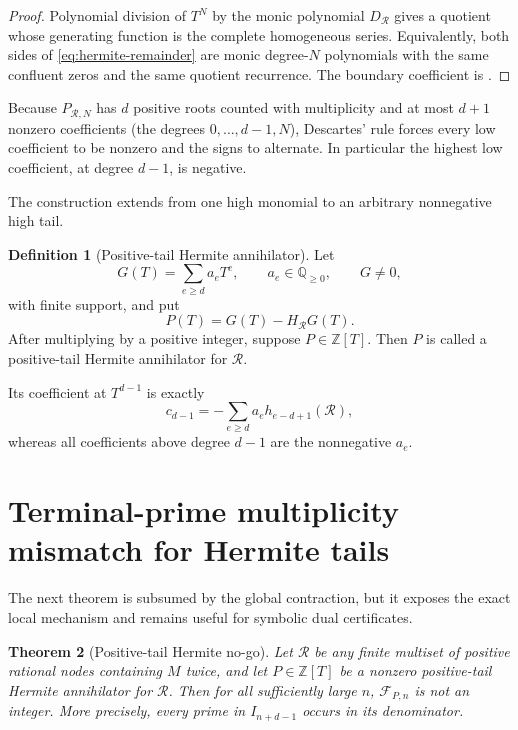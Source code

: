 \documentclass[11pt,oneside]{article}
\newtheorem{theorem}{Theorem}[section]
\theoremstyle{definition}
\newtheorem{definition}[theorem]{Definition}
\theoremstyle{remark}
\newcommand{\Z}{\mathbb Z}
\newcommand{\Q}{\mathbb Q}
\newcommand{\FF}{\mathcal F}
\begin{document}
\begin{proof}
Polynomial division of $T^N$ by the monic polynomial $D_{\mathcal R}$ gives a quotient whose
generating function is the complete homogeneous series.  Equivalently, both sides of
\eqref{eq:hermite-remainder} are monic degree-$N$ polynomials with the same confluent zeros
and the same quotient recurrence.  The boundary coefficient is
.
\end{proof}

Because $P_{\mathcal R,N}$ has $d$ positive roots counted with multiplicity and at most
$d+1$ nonzero coefficients (the degrees $0,\ldots,d-1,N$), Descartes' rule forces every low
coefficient to be nonzero and the signs to alternate.  In particular the highest low
coefficient, at degree $d-1$, is negative.

The construction extends from one high monomial to an arbitrary nonnegative high tail.

\begin{definition}[Positive-tail Hermite annihilator]
Let
\[
 G(T)=\sum_{e\ge d}a_eT^e,
 \qquad a_e\in\Q_{\ge0},
 \qquad G\ne0,
\]
with finite support, and put
\[
 P(T)=G(T)-H_{\mathcal R}G(T).
\]
After multiplying by a positive integer, suppose $P\in\Z[T]$.  Then $P$ is called a
positive-tail Hermite annihilator for $\mathcal R$.
\end{definition}

Its coefficient at $T^{d-1}$ is exactly
\begin{equation}
 c_{d-1}=-\sum_{e\ge d}a_eh_{e-d+1}(\mathcal R),       \label{eq:positive-tail-boundary}
\end{equation}
whereas all coefficients above degree $d-1$ are the nonnegative $a_e$.

\section{Terminal-prime multiplicity mismatch for Hermite tails}
\label{sec:hermite-nogo}

The next theorem is subsumed by the global contraction, but it exposes the exact local
mechanism and remains useful for symbolic dual certificates.

\begin{theorem}[Positive-tail Hermite no-go]
\label{thm:hermite-nogo}
Let $\mathcal R$ be any finite multiset of positive rational nodes containing $M$ twice, and
let $P\in\Z[T]$ be a nonzero positive-tail Hermite annihilator for $\mathcal R$.  Then for all
sufficiently large $n$, $\FF_{P,n}$ is not an integer.  More precisely, every prime in
$I_{n+d-1}$ occurs in its denominator.
\end{theorem}
\end{document}
